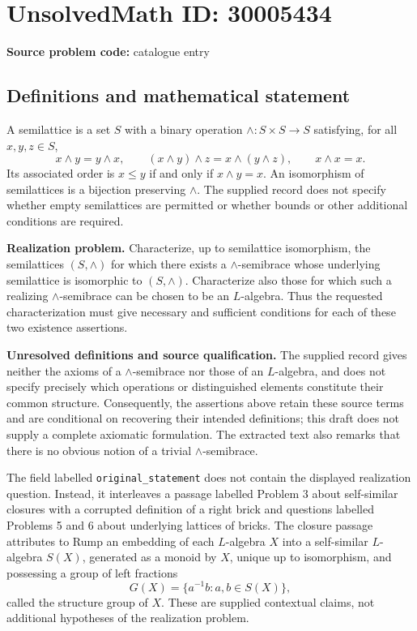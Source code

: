 \documentclass[11pt]{article}
\begin{document}
\section*{UnsolvedMath ID: 30005434}
\textbf{Source problem code:} catalogue entry
\subsection{Definitions and mathematical statement}
A semilattice is a set \(S\) with a binary operation \(\wedge\colon S\times S\to S\) satisfying, for all \(x,y,z\in S\),
\[
x\wedge y=y\wedge x,\qquad (x\wedge y)\wedge z=x\wedge(y\wedge z),\qquad x\wedge x=x.
\]
Its associated order is \(x\leq y\) if and only if \(x\wedge y=x\). An isomorphism of semilattices is a bijection preserving \(\wedge\). The supplied record does not specify whether empty semilattices are permitted or whether bounds or other additional conditions are required.

\textbf{Realization problem.} Characterize, up to semilattice isomorphism, the semilattices \((S,\wedge)\) for which there exists a \(\wedge\)-semibrace whose underlying semilattice is isomorphic to \((S,\wedge)\). Characterize also those for which such a realizing \(\wedge\)-semibrace can be chosen to be an \(L\)-algebra. Thus the requested characterization must give necessary and sufficient conditions for each of these two existence assertions.

\textbf{Unresolved definitions and source qualification.} The supplied record gives neither the axioms of a \(\wedge\)-semibrace nor those of an \(L\)-algebra, and does not specify precisely which operations or distinguished elements constitute their common structure. Consequently, the assertions above retain these source terms and are conditional on recovering their intended definitions; this draft does not supply a complete axiomatic formulation. The extracted text also remarks that there is no obvious notion of a trivial \(\wedge\)-semibrace.

The field labelled \texttt{original\_statement} does not contain the displayed realization question. Instead, it interleaves a passage labelled Problem 3 about self-similar closures with a corrupted definition of a right brick and questions labelled Problems 5 and 6 about underlying lattices of bricks. The closure passage attributes to Rump an embedding of each \(L\)-algebra \(X\) into a self-similar \(L\)-algebra \(S(X)\), generated as a monoid by \(X\), unique up to isomorphism, and possessing a group of left fractions
\[
G(X)=\{a^{-1}b:a,b\in S(X)\},
\]
called the structure group of \(X\). These are supplied contextual claims, not additional hypotheses of the realization problem.
\end{document}
